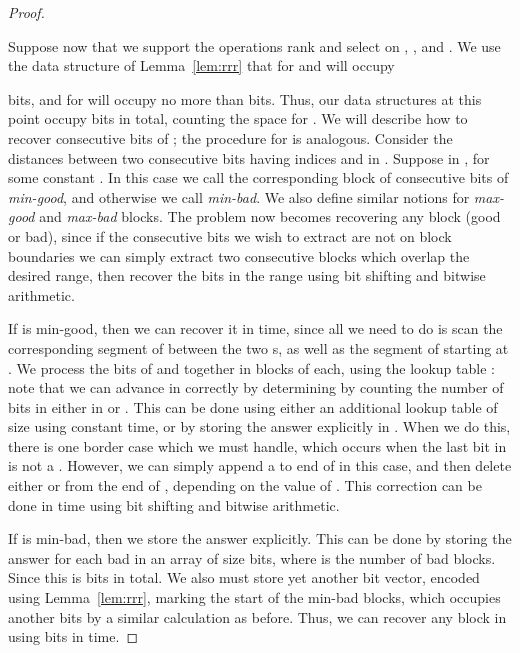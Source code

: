 \documentclass[runningheads]{llncs}
\begin{document}
\begin{proof}
\begin{enumerate}
\end{enumerate}

Suppose now that we support the operations rank and select on
, , and .  We use the data structure of
Lemma~\ref{lem:rrr} that for  and  will occupy

 

\noindent
bits, and for  will occupy no more than  bits.  Thus, our data structures at this point occupy
 bits in total, counting the space for .  We will describe
how to recover  consecutive bits of ; the procedure
for  is analogous.  Consider the distances between two
consecutive  bits having indices  and  in .
Suppose  in , for some constant
.  In this case we call the corresponding block  of
 consecutive bits of  \emph{min-good}, and otherwise
we call  \emph{min-bad}.  We also define similar notions for
\emph{max-good} and \emph{max-bad} blocks.  The problem now becomes
recovering any block (good or bad), since if the  consecutive
bits we wish to extract are not on block boundaries we can simply
extract two consecutive blocks which overlap the desired range, then
recover the bits in the range using bit shifting and bitwise
arithmetic.

If  is min-good, then we can recover it in 
time, since all we need to do is scan the corresponding segment of 
between the two s, as well as the segment of  starting at
.  We process the bits of  and  together
in blocks of  each, using the lookup table
: note that we can advance in  correctly by
determining  by counting the number of  bits in either in 
or .  This can be done using either an additional lookup table of
size  using constant time, or by storing the answer
explicitly in .  When we do this, there is one border
case which we must handle, which occurs when the last bit in  is
not a .  However, we can simply append a  to end of  in
this case, and then delete either  or  from the end of ,
depending on the value of .  This correction can be done in
 time using bit shifting and bitwise arithmetic.

If  is min-bad, then we store the answer explicitly.  This
can be done by storing the answer for each bad  in an array
of size  bits, where  is the number of bad blocks.  Since
 this is  bits in total.  We also must store yet another bit vector,
encoded using Lemma~\ref{lem:rrr}, marking the start of the min-bad
blocks, which occupies another  bits
by a similar calculation as before.  Thus, we can recover any block in
 using  bits in
 time.  


\end{proof}
\end{document}

